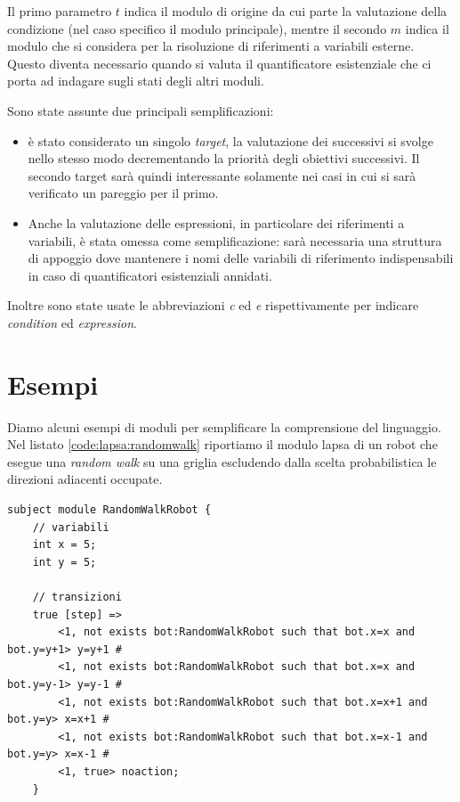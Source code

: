 Il primo parametro $t$ indica il modulo di origine da cui parte la valutazione della condizione (nel caso specifico il modulo principale), mentre il secondo $m$ indica il modulo che si considera per la risoluzione di riferimenti a variabili esterne. Questo diventa necessario quando si valuta il quantificatore esistenziale che ci porta ad indagare sugli stati degli altri moduli.

Sono state assunte due principali semplificazioni:
\begin{itemize}
	\item è stato considerato un singolo \emph{target}, la valutazione dei successivi si svolge nello stesso modo decrementando la priorità degli obiettivi successivi. Il secondo target sarà quindi interessante solamente nei casi in cui si sarà verificato un pareggio per il primo.
	\item Anche la valutazione delle espressioni, in particolare dei riferimenti a variabili, è stata omessa come semplificazione: sarà necessaria una struttura di appoggio dove mantenere i nomi delle variabili di riferimento indispensabili in caso di quantificatori esistenziali annidati.
\end{itemize}
Inoltre sono state usate le abbreviazioni \emph{c} ed \emph{e} rispettivamente per indicare \emph{condition} ed \emph{expression}.

\section{Esempi}
Diamo alcuni esempi di moduli per semplificare la comprensione del linguaggio.
Nel listato \ref{code:lapsa:randomwalk} riportiamo il modulo \ac{lapsa} di un robot che esegue una \emph{random walk} su una griglia escludendo dalla scelta probabilistica le direzioni adiacenti occupate.

\begin{lstlisting}[language=lapsa,style=eclipse,caption={Esempio di random walk in \ac{lapsa}},label=code:lapsa:randomwalk]
subject module RandomWalkRobot {
	// variabili
	int x = 5;
	int y = 5;
	
	// transizioni
	true [step] =>
		<1, not exists bot:RandomWalkRobot such that bot.x=x and bot.y=y+1> y=y+1 #
		<1, not exists bot:RandomWalkRobot such that bot.x=x and bot.y=y-1> y=y-1 # 
		<1, not exists bot:RandomWalkRobot such that bot.x=x+1 and bot.y=y> x=x+1 #
		<1, not exists bot:RandomWalkRobot such that bot.x=x-1 and bot.y=y> x=x-1 #
		<1, true> noaction;
	}
\end{lstlisting}

